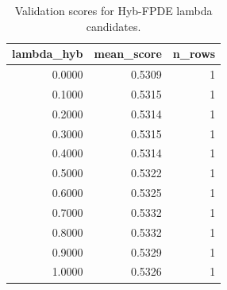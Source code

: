 \begin{table}[t]
\caption{Validation scores for Hyb-FPDE lambda candidates.}
\label{tab:lambda_distribution_computed}
\centering
\begin{tabular}{rrr}
\toprule
lambda\_hyb & mean\_score & n\_rows \\
\midrule
0.0000 & 0.5309 & 1 \\
0.1000 & 0.5315 & 1 \\
0.2000 & 0.5314 & 1 \\
0.3000 & 0.5315 & 1 \\
0.4000 & 0.5314 & 1 \\
0.5000 & 0.5322 & 1 \\
0.6000 & 0.5325 & 1 \\
0.7000 & 0.5332 & 1 \\
0.8000 & 0.5332 & 1 \\
0.9000 & 0.5329 & 1 \\
1.0000 & 0.5326 & 1 \\
\bottomrule
\end{tabular}

\end{table}
